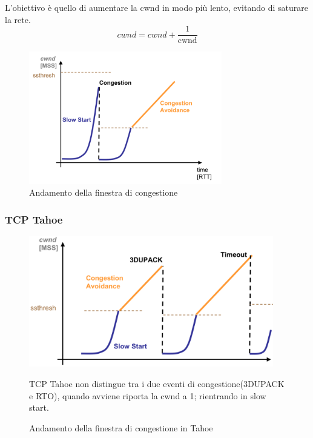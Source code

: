         L'obiettivo è quello di aumentare la cwnd in modo più lento, evitando di saturare la rete.
        \begin{equation}
            cwnd = cwnd + \frac{1}{\text{cwnd}}     \end{equation}
        
  
        \begin{figure}[h!]
        \centering
        \includegraphics[width=0.75\textwidth]{images/graficocongestione.png}
        \caption{Andamento della finestra di congestione}
        \label{fig:graficocongestione}
        \end{figure}

        \newpage

\subsubsection{TCP Tahoe}

\begin{figure}[h!]
    \begin{minipage}{0.6\textwidth}
        \centering
        \includegraphics[width=0.95\textwidth]{images/tahoe.png}
        \caption{Andamento della finestra di congestione in Tahoe}
        \label{fig:tcptahoe}
    \end{minipage}
    \hfill
    \begin{minipage}{0.48\textwidth}
        TCP Tahoe non distingue tra i due eventi di congestione(3DUPACK e RTO), quando avviene riporta la cwnd a 1; rientrando in slow start.
    \end{minipage}
\end{figure}

